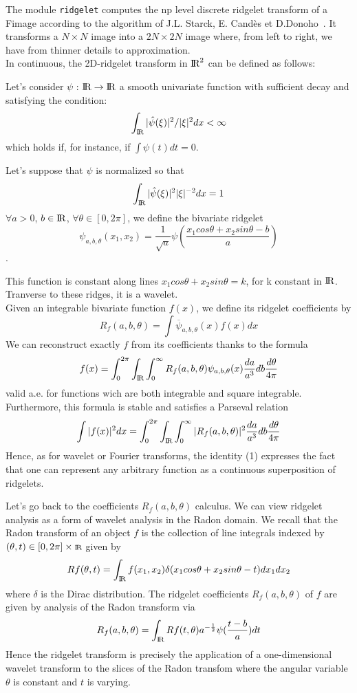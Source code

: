\def\R{\mbox{I\hspace{-0.15em}R}}

The module {\tt ridgelet} computes the np level discrete ridgelet transform of a Fimage according to the algorithm of J.L. Starck, E. Cand\`es et D.Donoho~\cite{starck.candes.ea:curvelet}.
It transforms a $N \times N$ image into a $2N\times2N$ image where, from left to right, we have from thinner details to approximation.\\

In continuous, the 2D-ridgelet transform in $\R^{2} $ can be defined as follows:

Let's consider $\psi$ : $\R \rightarrow \R$ a smooth univariate function with sufficient decay and satisfying the condition:
$$\int _{\scriptsize \R}{|\hat{\psi}(\xi)|^{2}/ |\xi| ^{2}}dx < \infty $$
which holds if, for instance, if $\int\psi(t)dt=0$.

Let's suppose that $\psi$ is normalized so that 
  $$\int _{\scriptsize \R}{|\hat{\psi}(\xi)|^{2} |\xi| ^{-2}}dx = 1  $$
$\forall a >0$, $b\in \R$, $\forall \theta \in [0,2\pi]$, we define the bivariate ridgelet $$\psi_{a,b,\theta}(x_{1},x_{2})=\frac{1}{\sqrt{a}} \psi(\frac{x_{1}cos \theta + x_{2}sin \theta-b}{a})$$.

This function is constant along lines $ x_{1}cos\theta + x_{2}sin\theta = k$, for k constant in  $\R$. Tranverse to these ridges, it is a wavelet.\\
Given an integrable bivariate function $f(x)$, we define its ridgelet coefficients by
$$ R_f(a,b,\theta)=\int\overline{\psi}_{a,b,\theta}(x)f(x)dx$$
We can reconstruct exactly $f$ from its coefficients thanks to the formula
\begin{equation}
f(x)=\int_0^{2\pi}\int_{\scriptsize \R}\int_0^{\infty}R_f(a,b,\theta)\psi_{a,b,\theta}(x) \frac{da}{a^3}db \frac{d\theta}{4\pi}
\end{equation}
valid a.e. for functions wich are both integrable and square integrable. Furthermore, this formula is stable and satisfies a Parseval relation
$$\int|{f(x)}|^2dx=\int_0^{2\pi}\int_{\scriptsize \R}\int_0^{\infty}|{R_f(a,b,\theta)}|^2 \frac{da}{a^3}db \frac{d\theta}{4\pi} $$ 
Hence, as for wavelet or Fourier transforms, the identity (1) expresses the fact that one can represent any arbitrary function as a continuous superposition of ridgelets.

Let's go back to the coefficients $R_f(a,b,\theta)$ calculus. We can view ridgelet analysis as a form of wavelet analysis in the Radon domain. We recall that the Radon transform of an object $f$ is the collection of line integrals indexed by $(\theta,t) \in [0,2\pi]\times {\scriptsize \R} $ given by
$$Rf(\theta,t)=\int_{\scriptsize \R} {f(x_{1},x_{2}) \delta(x_{1}cos\theta + x_{2} sin \theta -t) dx_{1}  dx_{2}}$$
where $\delta$ is the Dirac distribution. The ridgelet coefficients $ R_f(a,b,\theta)$ of $f$ are given by analysis of the Radon transform via
$$R_{f}(a,b,\theta)=\int_{\scriptsize \R} Rf(t,\theta)a^{-\frac{1}{2}}\psi (\frac{t-b}{a}) dt$$
Hence the ridgelet transform is precisely the application of a one-dimensional wavelet transform to the slices of the Radon transfom where the angular variable $\theta$ is constant and $t$ is varying.

